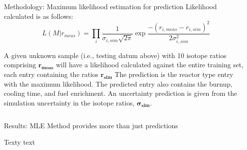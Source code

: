 \documentclass{beamer}
\begin{document}
\begin{frame}[t]{}
\begin{columns}
\begin{column}[T]{0.72\textwidth}
\begin{columns}[t]
\begin{column}{0.45\textwidth}
\begin{block}{Methodology: Maximum likelihood estimation for prediction}
Likelihood calculated is as follows:
\[L(M|r_{meas}) = \prod_i \frac{1}{\sigma_{i,sim} \sqrt{2\pi}} \exp{\frac{-(r_{i,meas} - r_{i,sim})^2}{2 \sigma_{i,sim}^2}}\]


A given unknown sample (i.e., testing datum above) with 10 isotope ratios
comprising $\mathbf{r_{meas}}$ will have a likelihood calculated against the
entire training set, each entry containing the ratios $\mathbf{r_{sim}}$ The
prediction is the reactor type entry with the maximum likelihood. The predicted
entry also contains the burnup, cooling time, and fuel enrichment.  An
uncertainty prediction is given from the simulation uncertainty in the isotope
ratios, $\mathbf{\sigma_{sim}}$.

\end{block}
\end{column}
\end{columns}

\begin{columns}[t]
\begin{column}{0.6\textwidth}
\begin{block}{Results: MLE Method provides more than just predictions}

Texty text \\~\\


\end{block}
\end{column}
\end{columns}
\end{column}
\end{columns}
\end{frame}
\end{document}
